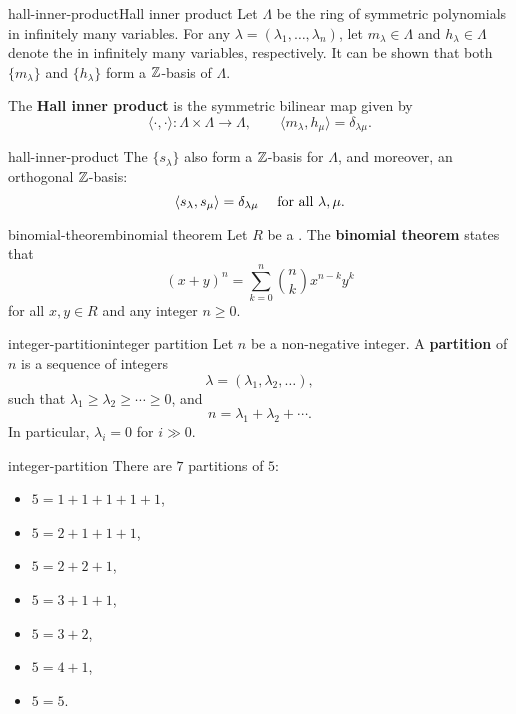 \begin{topic}{hall-inner-product}{Hall inner product}
    Let $\Lambda$ be the ring of symmetric polynomials in infinitely many variables. For any  $\lambda = (\lambda_1, \ldots, \lambda_n)$, let $m_\lambda \in \Lambda$ and $h_\lambda \in \Lambda$ denote the  in infinitely many variables, respectively. It can be shown that both $\{ m_\lambda \}$ and $\{ h_\lambda \}$ form a $\mathbb{Z}$-basis of $\Lambda$.
    
    The \textbf{Hall inner product} is the symmetric bilinear map given by
    \[ \langle \cdot, \cdot \rangle : \Lambda \times \Lambda \to \Lambda, \qquad \langle m_\lambda, h_\mu \rangle = \delta_{\lambda \mu} . \]
\end{topic}

\begin{example}{hall-inner-product}
    The  $\{ s_\lambda \}$ also form a $\mathbb{Z}$-basis for $\Lambda$, and moreover, an orthogonal $\mathbb{Z}$-basis:
    \[ \langle s_\lambda, s_\mu \rangle = \delta_{\lambda \mu} \quad \textup{ for all } \lambda, \mu . \]
\end{example}

\begin{topic}{binomial-theorem}{binomial theorem}
    Let $R$ be a . The \textbf{binomial theorem} states that
    \[ (x + y)^n = \sum_{k = 0}^{n} \binom{n}{k} x^{n - k} y^k \]
    for all $x, y \in R$ and any integer $n \ge 0$.
\end{topic}

\begin{topic}{integer-partition}{integer partition}
    Let $n$ be a non-negative integer. A \textbf{partition} of $n$ is a sequence of integers
    \[ \lambda = (\lambda_1, \lambda_2, \ldots) , \]
    such that $\lambda_1 \ge \lambda_2 \ge \cdots \ge 0$, and
    \[ n = \lambda_1 + \lambda_2 + \cdots . \]
    In particular, $\lambda_i = 0$ for $i \gg 0$.
\end{topic}

\begin{example}{integer-partition}
    There are $7$ partitions of $5$:
    \begin{itemize}
        \item $5 = 1 + 1 + 1 + 1 + 1$,
        \item $5 = 2 + 1 + 1 + 1$,
        \item $5 = 2 + 2 + 1$,
        \item $5 = 3 + 1 + 1$,
        \item $5 = 3 + 2$,
        \item $5 = 4 + 1$,
        \item $5 = 5$.
    \end{itemize}
\end{example}

